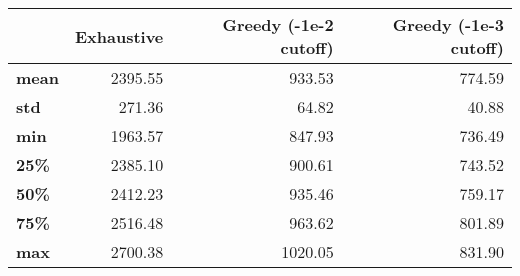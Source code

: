\begin{tabular}{lrrr}
\toprule
{} &  Exhaustive &  Greedy (-1e-2 cutoff) &  Greedy (-1e-3 cutoff) \\
\midrule
\textbf{mean} &     2395.55 &                 933.53 &                 774.59 \\
\textbf{std } &      271.36 &                  64.82 &                  40.88 \\
\textbf{min } &     1963.57 &                 847.93 &                 736.49 \\
\textbf{25\% } &     2385.10 &                 900.61 &                 743.52 \\
\textbf{50\% } &     2412.23 &                 935.46 &                 759.17 \\
\textbf{75\% } &     2516.48 &                 963.62 &                 801.89 \\
\textbf{max } &     2700.38 &                1020.05 &                 831.90 \\
\bottomrule
\end{tabular}
